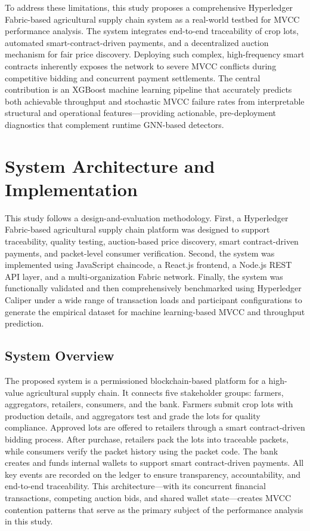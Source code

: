 \documentclass[12pt]{article}
\begin{document}
To address these limitations, this study proposes a comprehensive Hyperledger Fabric-based agricultural supply chain system as a real-world testbed for MVCC performance analysis. The system integrates end-to-end traceability of crop lots, automated smart-contract-driven payments, and a decentralized auction mechanism for fair price discovery. Deploying such complex, high-frequency smart contracts inherently exposes the network to severe MVCC conflicts during competitive bidding and concurrent payment settlements. The central contribution is an XGBoost machine learning pipeline that accurately predicts both achievable throughput and stochastic MVCC failure rates from interpretable structural and operational features---providing actionable, pre-deployment diagnostics that complement runtime GNN-based detectors.

\section{System Architecture and Implementation}
	
	This study follows a design-and-evaluation methodology. First, a Hyperledger Fabric-based agricultural supply chain platform was designed to support traceability, quality testing, auction-based price discovery, smart contract-driven payments, and packet-level consumer verification. Second, the system was implemented using JavaScript chaincode, a React.js frontend, a Node.js REST API layer, and a multi-organization Fabric network. Finally, the system was functionally validated and then comprehensively benchmarked using Hyperledger Caliper under a wide range of transaction loads and participant configurations to generate the empirical dataset for machine learning-based MVCC and throughput prediction.
	
\subsection{System Overview}

The proposed system is a permissioned blockchain-based platform for a high-value agricultural supply chain. It connects five stakeholder groups: farmers, aggregators, retailers, consumers, and the bank. Farmers submit crop lots with production details, and aggregators test and grade the lots for quality compliance. Approved lots are offered to retailers through a smart contract-driven bidding process. After purchase, retailers pack the lots into traceable packets, while consumers verify the packet history using the packet code. The bank creates and funds internal wallets to support smart contract-driven payments. All key events are recorded on the ledger to ensure transparency, accountability, and end-to-end traceability. This architecture—with its concurrent financial transactions, competing auction bids, and shared wallet state—creates MVCC contention patterns that serve as the primary subject of the performance analysis in this study.
\end{document}
